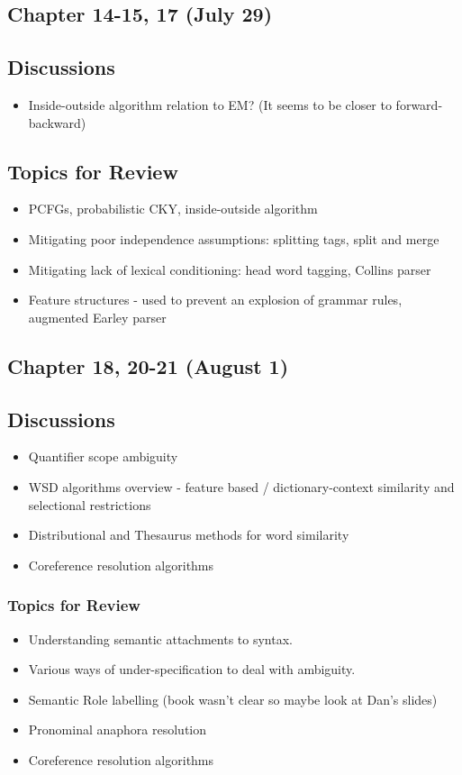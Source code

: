 \subsection{Chapter 14-15, 17 (July 29)}
\subsection*{Discussions}
\begin{itemize}
\item Inside-outside algorithm relation to EM? (It seems to be closer to forward-backward)
\end{itemize}

\subsection*{Topics for Review}
\begin{itemize}
\item PCFGs, probabilistic CKY, inside-outside algorithm
\item Mitigating poor independence assumptions: splitting tags, split and merge
\item Mitigating lack of lexical conditioning: head word tagging, Collins parser
\item Feature structures - used to prevent an explosion of grammar rules, augmented Earley parser
\end{itemize}


\subsection{Chapter 18, 20-21 (August 1)}
\subsection*{Discussions}
\begin{itemize}
\item Quantifier scope ambiguity
\item WSD algorithms overview - feature based / dictionary-context similarity and selectional restrictions
\item Distributional and Thesaurus methods for word similarity
\item Coreference resolution algorithms
\end{itemize}

\subsubsection*{Topics for Review}
\begin{itemize}
\item Understanding semantic attachments to syntax.
\item Various ways of under-specification to deal with ambiguity.
\item Semantic Role labelling (book wasn't clear so maybe look at Dan's slides)
\item Pronominal anaphora resolution
\item Coreference resolution algorithms
\end{itemize}

